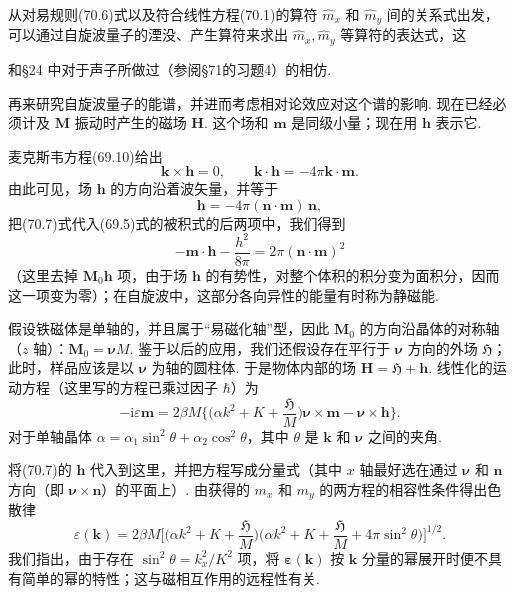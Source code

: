 从对易规则(70.6)式以及符合线性方程(70.1)的算符 $\hat{m}_x$ 和 $\hat{m}_y$ 间的关系式出发，可以通过自旋波量子的湮没、产生算符来求出 $\hat{m}_x,\hat{m}_y$ 等算符的表达式，这

和§24 中对于声子所做过（参阅§71的习题4）的相仿.

再来研究自旋波量子的能谱，并进而考虑相对论效应对这个谱的影响. 现在已经必须计及 $\bm{M}$ 振动时产生的磁场 $\bm{H}$. 这个场和 $\bm{m}$ 是同级小量；现在用 $\bm{h}$ 表示它.

麦克斯韦方程(69.10)给出
\begin{equation*}
\bm{k}\times\bm{h}=0,\qquad\bm{k}\cdot\bm{h}=-4\pi\bm{k}\cdot\bm{m}.
\end{equation*}
由此可见，场 $\bm{h}$ 的方向沿着波矢量，并等于
\begin{equation}
\bm{h}=-4\pi(\bm{n}\cdot\bm{m})\,\bm{n},
\end{equation}
把(70.7)式代入(69.5)式的被积式的后两项中，我们得到
\begin{equation}
-\bm{m}\cdot\bm{h}-\frac{h^2}{8\pi}=2\pi(\bm{n}\cdot\bm{m})^2
\end{equation}
（这里去掉 $\bm{M}_0\bm{h}$ 项，由于场 $\bm{h}$ 的有势性，对整个体积的积分变为面积分，因而这一项变为零）；在自旋波中，这部分各向异性的能量有时称为静磁能.

假设铁磁体是单轴的，并且属于“易磁化轴”型，因此 $\bm{M}_0$ 的方向沿晶体的对称轴（$z$ 轴）：$\bm{M}_0=\bm{\nu}M$. 鉴于以后的应用，我们还假设存在平行于 $\bm{\nu}$ 方向的外场 $\mathfrak{H}$；此时，样品应该是以 $\bm{\nu}$ 为轴的圆柱体. 于是物体内部的场 $\bm{H}=\mathfrak{H}+\bm{h}$. 线性化的运动方程（这里写的方程已乘过因子 $\hbar$）为
\begin{equation}
-\mathrm{i}\varepsilon\bm{m}=2\beta M\biggl\{\biggl(\alpha k^2+K+\frac{\mathfrak{H}}{M}\biggr)\bm{\nu}\times\bm{m}-\bm{\nu}\times\bm{h}\biggr\}.
\end{equation}
对于单轴晶体 $\alpha=\alpha_1\sin^2\theta+\alpha_2\cos^2\theta$，其中 $\theta$ 是 $\bm{k}$ 和 $\bm{\nu}$ 之间的夹角.

将(70.7)的 $\bm{h}$ 代入到这里，并把方程写成分量式（其中 $x$ 轴最好选在通过 $\bm{\nu}$ 和 $\bm{n}$ 方向（即 $\bm{\nu}\times\bm{n}$）的平面上）. 由获得的 $m_x$ 和 $m_y$ 的两方程的相容性条件得出色散律
\begin{equation}
\varepsilon(\bm{k})=2\beta M\biggl[\biggl(\alpha k^2+K+\frac{\mathfrak{H}}{M}\biggr)
\biggl(\alpha k^2+K+\frac{\mathfrak{H}}{M}+4\pi\sin^2\theta\biggr)\biggr]^{1/2}.
\end{equation}
我们指出，由于存在 $\sin^2\theta=k_x^2/K^2$ 项，将 $\bm{\varepsilon}(\bm{k})$ 按 $\bm{k}$ 分量的幂展开时便不具有简单的幂的特性；这与磁相互作用的远程性有关.

